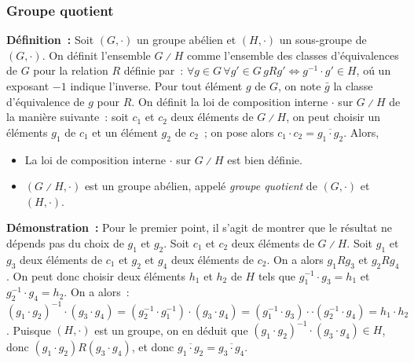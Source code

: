 \done

\subsubsection{Groupe quotient}

\noindent\textbf{Définition :} Soit $(G, \cdot)$ un groupe abélien et $(H, \cdot)$ un sous-groupe de $(G, \cdot)$.
    On définit l'ensemble $G \divslash H$ comme l'ensemble des classes d'équivalences de $G$ pour la relation $R$ définie par : $\forall g \in G \, \forall g' \in G \, g R g' \Leftrightarrow g^{-1} \cdot g' \in H$, oú un exposant $-1$ indique l'inverse. 
    Pour tout élément $g$ de $G$, on note $\bar{g}$ la classe d'équivalence de $g$ pour $R$.
    On définit la loi de composition interne $\cdot$ sur $G \divslash H$ de la manière suivante : soit $c_1$ et $c_2$ deux éléments de $G \divslash H$, on peut choisir un éléments $g_1$ de $c_1$ et un élément $g_2$ de $c_2$ ; on pose alors $c_1 \cdot c_2 = \overline{g_1 \cdot g_2}$. 
    Alors, 
    \begin{itemize}[nosep]
        \item La loi de composition interne $\cdot$ sur $G \divslash H$ est bien définie.
        \item $(G \divslash H, \cdot)$ est un groupe abélien, appelé \textit{groupe quotient} de $(G, \cdot)$ et $(H, \cdot)$.
    \end{itemize}

\medskip

\noindent\textbf{Démonstration :} Pour le premier point, il s'agit de montrer que le résultat ne dépends pas du choix de $g_1$ et $g_2$.
    Soit $c_1$ et $c_2$ deux éléments de $G \divslash H$. 
    Soit $g_1$ et $g_3$ deux éléments de $c_1$ et $g_2$ et $g_4$ deux éléments de $c_2$.
    On a alors $g_1 R g_3$ et $g_2 R g_4$.
    On peut donc choisir deux éléments $h_1$ et $h_2$ de $H$ tels que $g_1^{-1} \cdot g_3 = h_1$ et $g_2^{-1} \cdot g_4 = h_2$.
    On a alors : $(g_1 \cdot g_2)^{-1} \cdot (g_3 \cdot g_4) = (g_2^{-1} \cdot g_1^{-1}) \cdot (g_3 \cdot g_4) = (g_1^{-1} \cdot g_3) \cdot \cdot (g_2^{-1} \cdot g_4) = h_1 \cdot h_2$. 
    Puisque $(H, \cdot)$ est un groupe, on en déduit que $(g_1 \cdot g_2)^{-1} \cdot (g_3 \cdot g_4) \in H$, donc $(g_1 \cdot g_2) R (g_3 \cdot g_4)$, et donc $\overline{g_1 \cdot g_2} = \overline{g_3 \cdot g_4}$.

